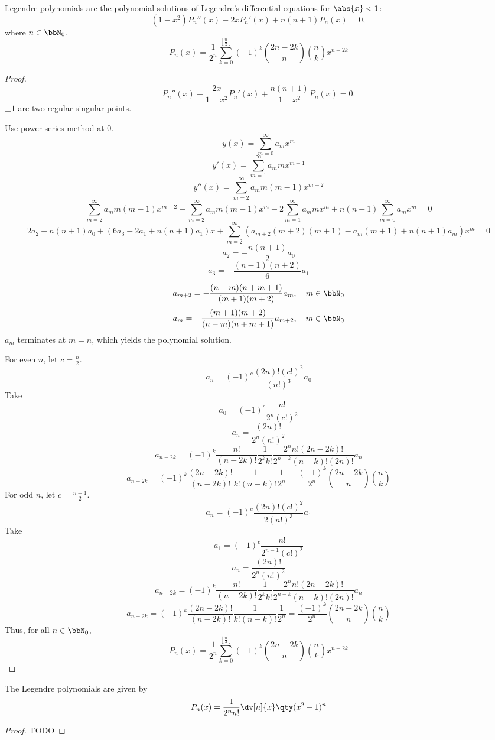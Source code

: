 \documentclass[a4paper,12pt]{report}
\begin{document}
\epr
{}
Legendre polynomials are the polynomial solutions of Legendre's differential equations for $\abs{x}<1$:
\[(1-x^2)P_n''(x)-2xP_n'(x)+n(n+1)P_n(x)=0,\]
where $n\in\bbN_0$.
\[P_n(x)=\frac{1}{2^n}\sum_{k=0}^{\left\lfloor\frac{n}{2}\right\rfloor}(-1)^k\binom{2n-2k}{n}\binom{n}{k}x^{n-2k}\]
\begin{proof}
\[P_n''(x)-\frac{2x}{1-x^2}P_n'(x)+\frac{n(n+1)}{1-x^2}P_n(x)=0.\]
\(\pm 1\) are two regular singular points.

Use power series method at $0$.
\[y(x)=\sum_{m=0}^{\infty}a_mx^m\]
\[y'(x)=\sum_{m=1}^{\infty}a_mmx^{m-1}\]
\[y''(x)=\sum_{m=2}^{\infty}a_mm(m-1)x^{m-2}\]
\[\sum_{m=2}^{\infty}a_mm(m-1)x^{m-2}-\sum_{m=2}^{\infty}a_mm(m-1)x^m-2\sum_{m=1}^{\infty}a_mmx^m+n(n+1)\sum_{m=0}^{\infty}a_mx^m=0\]
\[2a_2+n(n+1)a_0+(6a_3-2a_1+n(n+1)a_1)x+\sum_{m=2}^{\infty}(a_{m+2}(m+2)(m+1)-a_m(m+1)+n(n+1)a_m)x^m=0\]
\[a_2=-\frac{n(n+1)}{2}a_0\]
\[a_3=-\frac{(n-1)(n+2)}{6}a_1\]
\[a_{m+2}=-\frac{(n-m)(n+m+1)}{(m+1)(m+2)}a_m,\quad m\in\bbN_0\]
\[a_m=-\frac{(m+1)(m+2)}{(n-m)(n+m+1)}a_{m+2},\quad m\in\bbN_0\]
$a_m$ terminates at $m=n$, which yields the polynomial solution.

For even $n$, let $c=\frac{n}{2}$.
\[a_n=(-1)^c\frac{(2n)!(c!)^2}{(n!)^3}a_0\]
Take
\[a_0=(-1)^c\frac{n!}{2^n(c!)^2}\]
\[a_n=\frac{(2n)!}{2^n(n!)^2}\]
\[a_{n-2k}=(-1)^k\frac{n!}{(n-2k)!}\frac{1}{2^kk!}\frac{2^nn!(2n-2k)!}{2^{n-k}(n-k)!(2n)!}a_n\]
\[a_{n-2k}=(-1)^k\frac{(2n-2k)!}{(n-2k)!}\frac{1}{k!(n-k)!}\frac{1}{2^n}=\frac{(-1)^k}{2^n}\binom{2n-2k}{n}\binom{n}{k}\]
For odd $n$, let $c=\frac{n-1}{2}$.
\[a_n=(-1)^c\frac{(2n)!(c!)^2}{2(n!)^3}a_1\]
Take
\[a_1=(-1)^c\frac{n!}{2^{n-1}(c!)^2}\]
\[a_n=\frac{(2n)!}{2^n(n!)^2}\]
\[a_{n-2k}=(-1)^k\frac{n!}{(n-2k)!}\frac{1}{2^kk!}\frac{2^nn!(2n-2k)!}{2^{n-k}(n-k)!(2n)!}a_n\]
\[a_{n-2k}=(-1)^k\frac{(2n-2k)!}{(n-2k)!}\frac{1}{k!(n-k)!}\frac{1}{2^n}=\frac{(-1)^k}{2^n}\binom{2n-2k}{n}\binom{n}{k}\]
Thus, for all $n\in\bbN_0$,
\[P_n(x)=\frac{1}{2^n}\sum_{k=0}^{\left\lfloor\frac{n}{2}\right\rfloor}(-1)^k\binom{2n-2k}{n}\binom{n}{k}x^{n-2k}\]
\end{proof}
The Legendre polynomials are given by
\[P_n(x)=\frac{1}{2^nn!}\dv[n]{x}\qty(x^2-1)^n\]
\begin{proof}
TODO 
\end{proof}
\end{document}
